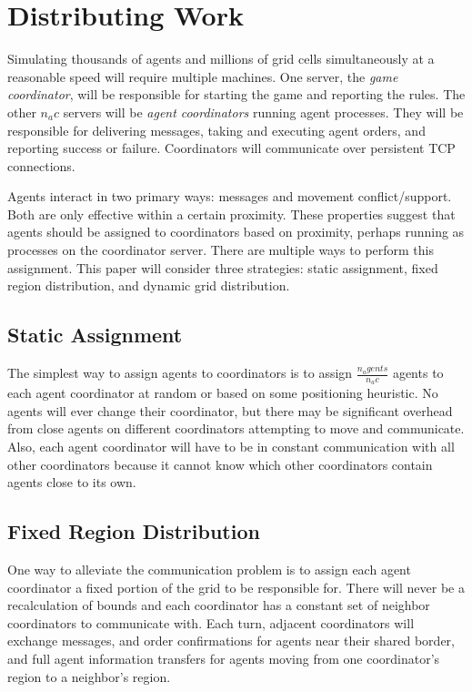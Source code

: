 \section{Distributing Work}

Simulating thousands of agents and millions of grid cells simultaneously at a reasonable speed will require multiple machines. One server, the \emph{game coordinator}, will be responsible for starting the game and reporting the rules. The other $n_ac$ servers will be \emph{agent coordinators} running agent processes. They will be responsible for delivering messages, taking and executing agent orders, and reporting success or failure. Coordinators will communicate over persistent TCP connections.

Agents interact in two primary ways: messages and movement conflict/support. Both are only effective within a certain proximity. These properties suggest that agents should be assigned to coordinators based on proximity, perhaps running as processes on the coordinator server. There are multiple ways to perform this assignment. This paper will consider three strategies: static assignment, fixed region distribution, and dynamic grid distribution.

\subsection{Static Assignment}

The simplest way to assign agents to coordinators is to assign $\frac{n_agents}{n_ac}$ agents to each agent coordinator at random or based on some positioning heuristic. No agents will ever change their coordinator, but there may be significant overhead from close agents on different coordinators attempting to move and communicate. Also, each agent coordinator will have to be in constant communication with all other coordinators because it cannot know which other coordinators contain agents close to its own.

\subsection{Fixed Region Distribution}

One way to alleviate the communication problem is to assign each agent coordinator a fixed portion of the grid to be responsible for. There will never be a recalculation of bounds and each coordinator has a constant set of neighbor coordinators to communicate with. Each turn, adjacent coordinators will exchange messages, and order confirmations for agents near their shared border, and full agent information transfers for agents moving from one coordinator's region to a neighbor's region.

